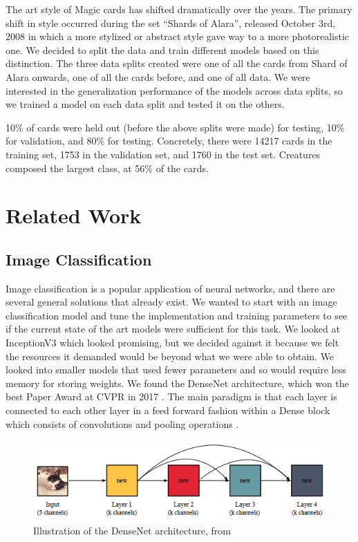 \documentclass[letterpaper]{article} %
\begin{document}
The art style of Magic cards has shifted dramatically over the years.
The primary shift in style occurred during the set “Shards of Alara”,
released October 3rd, 2008 in which a more stylized or abstract style
gave way to a more photorealistic one.
We decided to split the data and train different models based on this distinction.
The three data splits created were one of
all the cards from Shard of Alara onwards,
one of all the cards before,
and one of all data.
We were interested in the generalization performance
of the models across data splits,
so we trained a model on each data split and tested it on the others.

10\% of cards were held out (before the above splits were made) for testing,
10\% for validation, and 80\% for testing.
Concretely,
there were 14217 cards in the training set,
1753 in the validation set,
and 1760 in the test set.
Creatures composed the largest class,
at 56\% of the cards.


\section{Related Work}

\subsection{Image Classification}

Image classification is a popular application of neural networks,
and there are several general solutions that already exist.
We wanted to start with an image classification model
and tune the implementation and training parameters
to see if the current state of the art models were sufficient for this task.
We looked at InceptionV3 \cite{SzegedyChristian2015RtIA}
which looked promising,
but we decided against it
because we felt the resources it demanded would be beyond what we were able to obtain.
We looked into smaller models that used fewer
parameters and so would require less memory for storing weights.
We found the DenseNet architecture,
which won the best Paper Award at CVPR in
2017 \cite{huang2017densely}.
The main paradigm is that each layer is connected to each
other layer in a feed forward fashion within a Dense block which consists of
convolutions and pooling operations \cite{huang2017densely}.

\begin{figure}[h]
  \includegraphics[width=.45\textwidth]{densenet}
  \caption{Illustration of the DenseNet architecture, from \cite{PleissGeoff2017MIoD}}
\end{figure}
\end{document}
